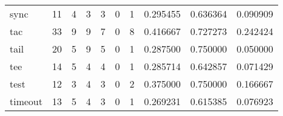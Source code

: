 \begin{tabular}{lrrrrrrrrr}
sync      &                                      11 &                                                  4 &                                                  3 &                                                  3 &                                                  0 &                                                  1 &                                           0.295455 &                               0.636364 &                             0.090909 \\
tac       &                                      33 &                                                  9 &                                                  9 &                                                  7 &                                                  0 &                                                  8 &                                           0.416667 &                               0.727273 &                             0.242424 \\
tail      &                                      20 &                                                  5 &                                                  9 &                                                  5 &                                                  0 &                                                  1 &                                           0.287500 &                               0.750000 &                             0.050000 \\
tee       &                                      14 &                                                  5 &                                                  4 &                                                  4 &                                                  0 &                                                  1 &                                           0.285714 &                               0.642857 &                             0.071429 \\
test      &                                      12 &                                                  3 &                                                  4 &                                                  3 &                                                  0 &                                                  2 &                                           0.375000 &                               0.750000 &                             0.166667 \\
timeout   &                                      13 &                                                  5 &                                                  4 &                                                  3 &                                                  0 &                                                  1 &                                           0.269231 &                               0.615385 &                             0.076923 \\

\end{tabular}
